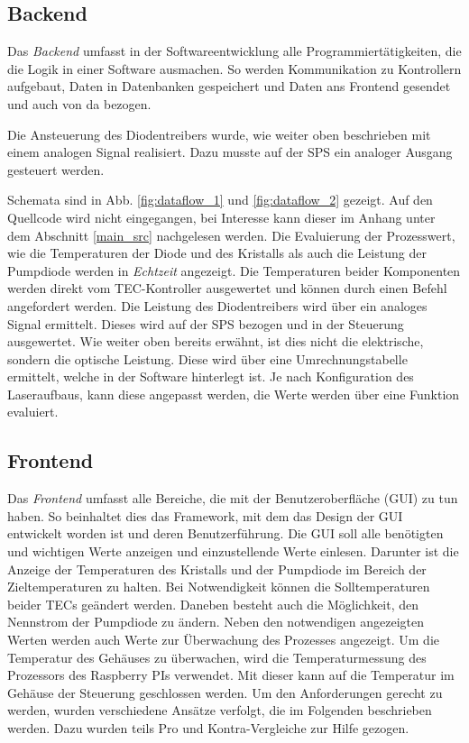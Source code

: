 \subsection{Backend}
\label{chptr:software_backend}
Das \textit{Backend} umfasst in der Softwareentwicklung alle Programmiertätigkeiten, die die Logik in einer Software ausmachen. So werden Kommunikation zu Kontrollern aufgebaut, Daten in Datenbanken gespeichert und Daten ans Frontend gesendet und auch von da bezogen.

Die Ansteuerung des Diodentreibers wurde, wie weiter oben beschrieben mit einem analogen Signal realisiert. Dazu musste auf der SPS ein analoger Ausgang gesteuert werden.

Schemata sind in Abb. \ref{fig:dataflow_1} und \ref{fig:dataflow_2} gezeigt. Auf den Quellcode wird nicht eingegangen, bei Interesse kann dieser im Anhang unter dem Abschnitt \ref{main_src} nachgelesen werden.
Die Evaluierung der Prozesswert, wie die Temperaturen der Diode und des Kristalls als auch die Leistung der Pumpdiode werden in \textit{Echtzeit} angezeigt.
Die Temperaturen beider Komponenten werden direkt vom TEC-Kontroller ausgewertet und können durch einen Befehl angefordert werden.
Die Leistung des Diodentreibers wird über ein analoges Signal ermittelt. Dieses wird auf der SPS bezogen und in der Steuerung ausgewertet. Wie weiter oben bereits erwähnt, ist dies nicht die elektrische, sondern die optische Leistung. Diese wird über eine Umrechnungstabelle ermittelt, welche in der Software hinterlegt ist. Je nach Konfiguration des Laseraufbaus, kann diese angepasst werden, die Werte werden über eine Funktion evaluiert.

\subsection{Frontend}
Das \textit{Frontend} umfasst alle Bereiche, die mit der Benutzeroberfläche (GUI) zu tun haben. So beinhaltet dies das Framework, mit dem das Design der GUI entwickelt worden ist und deren Benutzerführung. 
Die GUI soll alle benötigten und wichtigen Werte anzeigen und einzustellende Werte einlesen. Darunter ist die Anzeige der Temperaturen des Kristalls und der Pumpdiode im Bereich der Zieltemperaturen zu halten. Bei Notwendigkeit können die Solltemperaturen beider TECs geändert werden. Daneben besteht auch die Möglichkeit, den Nennstrom der Pumpdiode zu ändern. Neben den notwendigen angezeigten Werten werden auch Werte zur Überwachung des Prozesses angezeigt. Um die Temperatur des Gehäuses zu überwachen, wird die Temperaturmessung des Prozessors des Raspberry PIs verwendet. Mit dieser kann auf die Temperatur im Gehäuse der Steuerung geschlossen werden. Um den Anforderungen gerecht zu werden, wurden verschiedene Ansätze verfolgt, die im Folgenden beschrieben werden. Dazu wurden teils Pro und Kontra-Vergleiche zur Hilfe gezogen.\\

